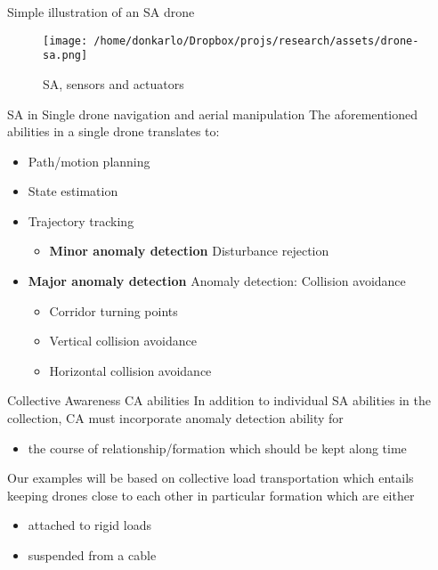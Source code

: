 \documentclass[unknownkeysallowed]{beamer}
\begin{document}
	\begin{frame}{Simple illustration of an SA drone}
		\begin{figure}
			\texttt{[image: /home/donkarlo/Dropbox/projs/research/assets/drone-sa.png]}
			\caption{SA, sensors and actuators}
		\end{figure}
	\end{frame}

	\begin{frame}{SA in Single drone navigation and aerial manipulation}
		The aforementioned abilities in a single drone translates to:
		\begin{itemize}
			\item Path/motion planning
			\item State estimation
			\item Trajectory tracking
				\begin{itemize}
					\item \textbf{Minor anomaly detection} Disturbance rejection
				\end{itemize}
			\item \textbf{Major anomaly detection}  Anomaly detection: Collision avoidance
				\begin{itemize}
					\item Corridor turning points
					\item Vertical collision avoidance
					\item Horizontal collision avoidance
				\end{itemize}
		\end{itemize}
	\end{frame}

	\begin{frame}{Collective Awareness {CA} abilities}
		In addition to individual SA abilities in the collection, CA must incorporate anomaly detection ability for 
		\begin{itemize}
			\item the course of relationship/formation which should be kept along time
		\end{itemize}
		Our examples  will be based on collective load transportation which entails keeping drones close to each other in particular formation which are either
		\begin{itemize}
			\item attached to rigid loads
			\item suspended from a cable
		\end{itemize}
	\end{frame}
\end{document}
